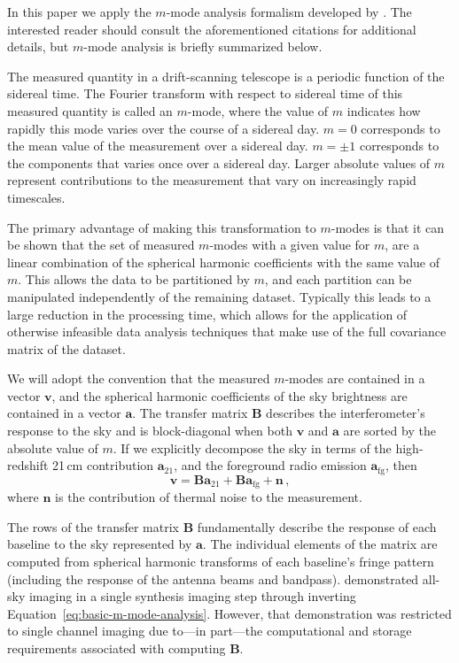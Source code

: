 \documentclass[twocolumn]{aastex62}
\renewcommand{\b}{\pmb}
\begin{document}
In this paper we apply the $m$-mode analysis formalism developed by \citet{2014ApJ...781...57S,
2015PhRvD..91h3514S}. The interested reader should consult the aforementioned citations for
additional details, but $m$-mode analysis is briefly summarized below.

The measured quantity in a drift-scanning telescope is a periodic function of the sidereal time.
The Fourier transform with respect to sidereal time of this measured quantity is called an $m$-mode,
where the value of $m$ indicates how rapidly this mode varies over the course of a sidereal day.
$m=0$ corresponds to the mean value of the measurement over a sidereal day. $m=\pm1$ corresponds to
the components that varies once over a sidereal day. Larger absolute values of $m$ represent
contributions to the measurement that vary on increasingly rapid timescales.

The primary advantage of making this transformation to $m$-modes is that it can be shown that the
set of measured $m$-modes with a given value for $m$, are a linear combination of the spherical
harmonic coefficients with the same value of $m$. This allows the data to be partitioned by $m$, and
each partition can be manipulated independently of the remaining dataset. Typically this leads to a
large reduction in the processing time, which allows for the application of otherwise infeasible
data analysis techniques that make use of the full covariance matrix of the dataset.

We will adopt the convention that the measured $m$-modes are contained in a vector $\b v$, and the
spherical harmonic coefficients of the sky brightness are contained in a vector $\b a$. The transfer
matrix $\b B$ describes the interferometer's response to the sky and is block-diagonal when both $\b
v$ and $\b a$ are sorted by the absolute value of $m$. If we explicitly decompose the sky in terms
of the high-redshift 21\,cm contribution $\b a_\text{21}$, and the foreground radio emission $\b
a_\text{fg}$, then
\begin{equation}\label{eq:basic-m-mode-analysis}
    \b v = \b B \b a_\text{21} + \b B \b a_\text{fg} + \b n \,,
\end{equation}
where $\b n$ is the contribution of thermal noise to the measurement.

The rows of the transfer matrix $\b B$ fundamentally describe the response of each baseline to the
sky represented by $\b a$. The individual elements of the matrix are computed from spherical
harmonic transforms of each baseline's fringe pattern (including the response of the antenna beams
and bandpass). \citet{2018AJ....156...32E} demonstrated all-sky imaging in a single synthesis
imaging step through inverting Equation~\ref{eq:basic-m-mode-analysis}. However, that demonstration
was restricted to single channel imaging due to---in part---the computational and storage
requirements associated with computing $\b B$.
\end{document}
